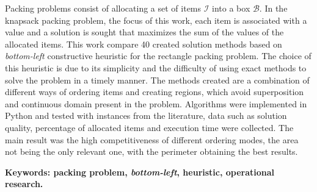 \begin{resumo}[Abstract]
    Packing problems consist of allocating a set of items $\mathcal{I}$ into a box $\mathcal{B}$.
    In the knapsack packing problem, the focus of this work, each item is associated with a value
    and a solution is sought that maximizes the sum of the values of the allocated items.
    This work compare 40 created solution methods based on \textit{bottom-left} constructive
    heuristic for the rectangle packing problem.
    The choice of this heuristic is due to its simplicity and the difficulty of using exact methods
    to solve the problem in a timely manner.
    The methods created are a combination of different ways of ordering items and creating regions,
    which avoid superposition and continuous domain present in the problem.
    Algorithms were implemented in Python and tested with instances from the literature,
    data such as solution quality, percentage of allocated items and execution time were collected.
    The main result was the high competitiveness of different ordering modes, the area not being
    the only relevant one, with the perimeter obtaining the best results.

    \textbf{Keywords: packing problem, \textit{bottom-left}, heuristic, operational research.}
\end{resumo}
\newpage
